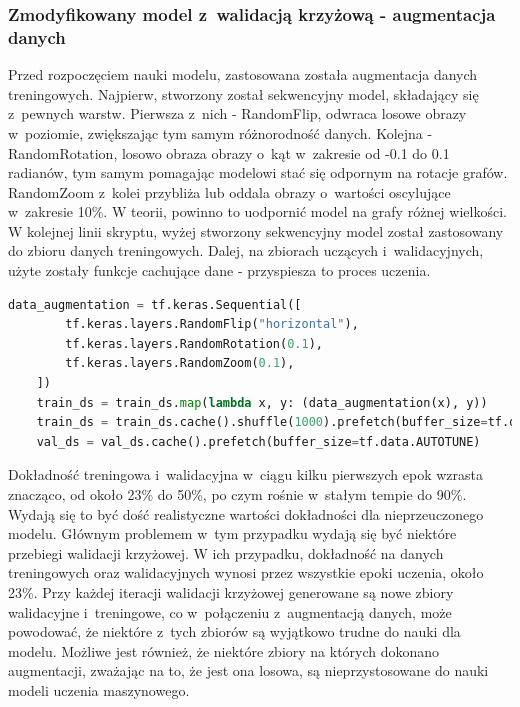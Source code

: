 \subsubsection{Zmodyfikowany model z~walidacją krzyżową - augmentacja danych}

Przed rozpoczęciem nauki modelu, zastosowana została augmentacja danych treningowych.
Najpierw, stworzony został sekwencyjny model, składający się z~pewnych warstw.
Pierwsza z~nich - RandomFlip, odwraca losowe obrazy w~poziomie, zwiększając tym samym różnorodność danych.
Kolejna - RandomRotation, losowo obraza obrazy o~kąt w~zakresie od -0.1 do 0.1 radianów,
tym samym pomagając modelowi stać się odpornym na rotacje grafów.
RandomZoom z~kolei przybliża lub oddala obrazy o~wartości oscylujące w~zakresie 10\%.
W teorii, powinno to uodpornić model na grafy różnej wielkości.
W kolejnej linii skryptu, wyżej stworzony sekwencyjny model został zastosowany do zbioru danych treningowych.
Dalej, na zbiorach uczących i~walidacyjnych, użyte zostały funkcje cachujące dane - przyspiesza to proces uczenia.

\begin{lstlisting}[language=Python,caption=Listing zmodyfikowanego skryptu poprzedzającego tworzenie modelu z~walidacją krzyżową
	- wersja 3,label={tests-model-crossval3}]
	data_augmentation = tf.keras.Sequential([
        tf.keras.layers.RandomFlip("horizontal"),
        tf.keras.layers.RandomRotation(0.1),
        tf.keras.layers.RandomZoom(0.1),
    ])
    train_ds = train_ds.map(lambda x, y: (data_augmentation(x), y))
    train_ds = train_ds.cache().shuffle(1000).prefetch(buffer_size=tf.data.AUTOTUNE)
    val_ds = val_ds.cache().prefetch(buffer_size=tf.data.AUTOTUNE)
\end{lstlisting}

Dokładność treningowa i~walidacyjna w~ciągu kilku pierwszych epok wzrasta znacząco,
od około 23\% do 50\%, po czym rośnie w~stałym tempie do 90\%.
Wydają się to być dość realistyczne wartości dokładności dla nieprzeuczonego modelu.
Głównym problemem w~tym przypadku wydają się być niektóre przebiegi walidacji krzyżowej.
W ich przypadku, dokładność na danych treningowych oraz walidacyjnych wynosi przez wszystkie epoki uczenia, około 23\%.
Przy każdej iteracji walidacji krzyżowej generowane są nowe zbiory walidacyjne i~treningowe,
co w~połączeniu z~augmentacją danych, może powodować, że niektóre z~tych zbiorów są wyjątkowo trudne do nauki dla modelu.
Możliwe jest również, że niektóre zbiory na których dokonano augmentacji, zważając na to, że jest ona losowa,
są nieprzystosowane do nauki modeli uczenia maszynowego.

